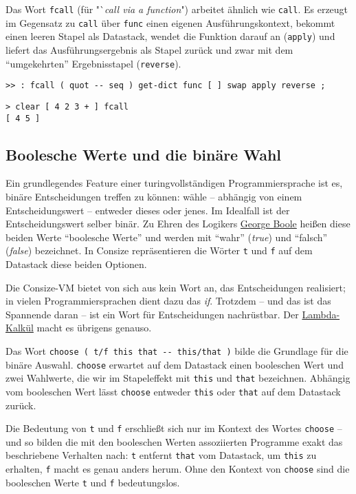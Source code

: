 Das Wort \verb|fcall| (für "`\emph{call via a function}") arbeitet ähnlich wie \verb|call|. Es erzeugt im Gegensatz zu \verb|call| über \verb|func| einen eigenen Ausführungs\-kon\-text, bekommt einen leeren Stapel als Datastack, wendet die Funktion darauf an (\verb|apply|) und liefert das Ausführungsergebnis als Stapel zurück und zwar mit dem "`umgekehrten"' Ergebnisstapel (\verb|reverse|).

\begin{verbatim}
>> : fcall ( quot -- seq ) get-dict func [ ] swap apply reverse ;  
\end{verbatim}

\begin{verbatim}
> clear [ 4 2 3 + ] fcall
[ 4 5 ]
\end{verbatim}

\subsection{Boolesche Werte und die binäre Wahl}

Ein grundlegendes Feature einer turingvollständigen Programmiersprache ist es, binäre Entscheidungen treffen zu können: wähle -- abhängig von einem Entscheidungswert -- entweder dieses oder jenes. Im Idealfall ist der Entscheidungswert selber binär. Zu Ehren des Logikers \href{http://de.wikipedia.org/wiki/George\_Boole}{{\sc George Boole}} heißen diese beiden Werte "`boolesche Werte"' und werden mit "`wahr"' (\emph{true}) und "`falsch"' (\emph{false}) bezeichnet. In Consize repräsentieren die Wörter \verb|t| und \verb|f| auf dem Datastack diese beiden Optionen.

Die Consize-VM bietet von sich aus kein Wort an, das Entscheidungen realisiert; in vielen Programmiersprachen dient dazu das \emph{if}. Trotzdem -- und das ist das Spannende daran -- ist ein Wort für Entscheidungen nachrüstbar. Der \href{http://en.wikipedia.org/wiki/Lambda_calculus}{Lambda-Kalkül} macht es übrigens genauso.

Das Wort \verb|choose ( t/f this that -- this/that )| bilde die Grundlage für die binäre Auswahl. \verb|choose| erwartet auf dem Datastack einen booleschen Wert und zwei Wahlwerte, die wir im Stapeleffekt mit \verb|this| und \verb|that| bezeichnen. Abhängig vom booleschen Wert lässt \verb|choose| entweder \verb|this| oder \verb|that| auf dem Datastack zurück.

Die Bedeutung von \verb|t| und \verb|f| erschließt sich nur im Kontext des Wortes \verb|choose| -- und so bilden die mit den booleschen Werten assoziierten Programme exakt das beschriebene Verhalten nach: \verb|t| entfernt \verb|that| vom Datastack, um \verb|this| zu erhalten, \verb|f| macht es genau anders herum. Ohne den Kontext von \verb|choose| sind die booleschen Werte \verb|t| und \verb|f| bedeutungslos. 

